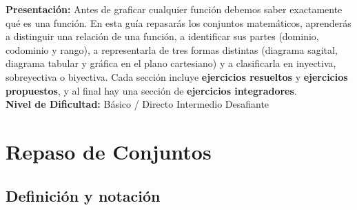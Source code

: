 \documentclass[12pt, letterpaper]{article}
\begin{document}


\vspace{4pt}
\begin{cuadroinfo}
  \small
  \textbf{Presentación:} Antes de graficar cualquier función debemos saber exactamente qué es una función. En esta guía repasarás los conjuntos matemáticos, aprenderás a distinguir una relación de una función, a identificar sus partes (dominio, codominio y rango), a representarla de tres formas distintas (diagrama sagital, diagrama tabular y gráfica en el plano cartesiano) y a clasificarla en inyectiva, sobreyectiva o biyectiva. Cada sección incluye \textbf{ejercicios resueltos} y \textbf{ejercicios propuestos}, y al final hay una sección de \textbf{ejercicios integradores}.
  \\[4pt]
  \textbf{Nivel de Dificultad:}\quad
  \facil{} Básico / Directo \quad
  \medio{} Intermedio \quad
  \dificil{} Desafiante
\end{cuadroinfo}

\vspace{8pt}

\section{Repaso de Conjuntos}

\subsection{Definición y notación}
\end{document}

